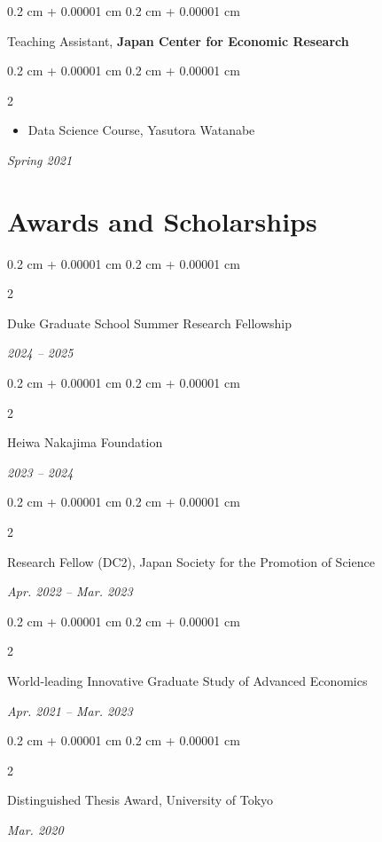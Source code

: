 \documentclass[11pt, letterpaper]{article}
\newenvironment{highlights}{
    \begin{itemize}[
        topsep=0.10 cm,
        parsep=0.10 cm,
        partopsep=0pt,
        itemsep=0pt,
        leftmargin=0.4 cm + 10pt
    ]
}{
    \end{itemize}
} %
\newenvironment{onecolentry}{
    \begin{adjustwidth}{
        0.2 cm + 0.00001 cm
    }{
        0.2 cm + 0.00001 cm
    }
}{
    \end{adjustwidth}
} %
\newenvironment{twocolentry}[2][]{
    \onecolentry
    \def\secondColumn{#2}
    \setcolumnwidth{\fill, 4.5 cm}
    \begin{paracol}{2}
}{
    \switchcolumn \raggedleft \secondColumn
    \end{paracol}
    \endonecolentry
} %
\begin{document}
    \begin{onecolentry}
        Teaching Assistant, \textbf{Japan Center for Economic Research}
    \end{onecolentry}
    \vspace{0.1cm}

    
    \begin{twocolentry}{\textit{Spring 2021}}
            
        \begin{highlights}
        \item Data Science Course, Yasutora Watanabe
        \end{highlights}
    \end{twocolentry}
    \vspace{0.2cm}
    
    \section{Awards and Scholarships}
    
    \begin{twocolentry}{\textit{2024 – 2025}}
            Duke Graduate School Summer Research Fellowship
    \end{twocolentry}
    \vspace{0.2cm}
    
    \begin{twocolentry}{\textit{2023 – 2024}}
            Heiwa Nakajima Foundation
    \end{twocolentry}
    \vspace{0.2cm}
    
    \begin{twocolentry}{\textit{Apr. 2022 – Mar. 2023}}
            Research Fellow (DC2), Japan Society for the Promotion of Science 
    \end{twocolentry}
    \vspace{0.2cm}

    \begin{twocolentry}{\hfill \textit{Apr. 2021 – Mar. 2023}}
            World-leading Innovative Graduate Study of Advanced Economics 
    \end{twocolentry}
    \vspace{0.2cm}

    \begin{twocolentry}{\hfill \textit{Mar. 2020}}
            Distinguished Thesis Award, University of Tokyo
    \end{twocolentry}
    \vspace{0.2cm}
\end{document}
